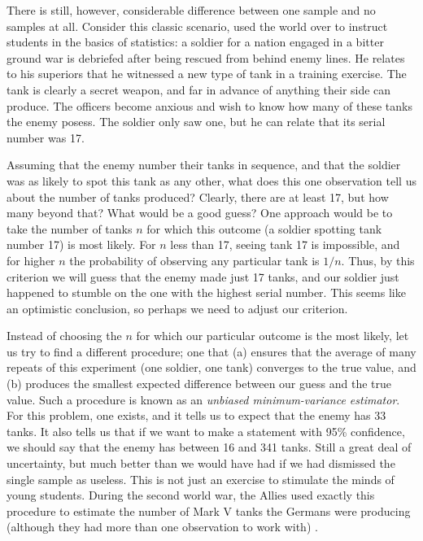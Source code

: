  \index{$5\sigma$} 

There is still, however, considerable difference between one sample and no samples at all. Consider this classic scenario, used the world over to instruct students in the basics of statistics: a soldier for a nation engaged in a bitter ground war is debriefed after being rescued from behind enemy lines. He relates to his superiors that he witnessed a new type of tank in a training exercise. The tank is clearly a secret weapon, and far in advance of anything their side can produce. The officers become anxious and wish to know how many of these tanks the enemy posess. The soldier only saw one, but he can relate that its serial number was 17.


Assuming that the enemy number their tanks in sequence, and that the soldier was as likely to spot this tank as any other, what does this one observation tell us about the number of tanks produced? Clearly, there are at least 17, but how many beyond that? What would be a good guess? One approach would be to take the number of tanks $n$ for which this outcome (a soldier spotting tank number 17) is most likely. For $n$ less than 17, seeing tank 17 is impossible, and for higher $n$ the probability of observing any particular tank is $1/n$. Thus, by this criterion we will guess that the enemy made just 17 tanks, and our soldier just happened to stumble on the one with the highest serial number. This seems like an optimistic conclusion, so perhaps we need to adjust our criterion.

Instead of choosing the $n$ for which our particular outcome is the most likely, let us try to find a different procedure; one that (a) ensures that the average of many repeats of this experiment (one soldier, one tank) converges to the true value, and (b) produces the smallest expected difference between our guess and the true value. Such a procedure is known as an \emph{unbiased minimum-variance estimator}. For this problem, one exists, and it tells us to expect that the enemy has 33 tanks. It also tells us that if we want to make a statement with 95\% confidence, we should say that the enemy has between 16 and 341 tanks. Still a great deal of uncertainty, but much better than we would have had if we had dismissed the single sample as useless. This is not just an exercise to stimulate the minds of young students. During the second world war, the Allies used exactly this procedure to estimate the number of Mark V tanks the Germans were producing (although they had more than one observation to work with) \cite{davies2006statistical}.


